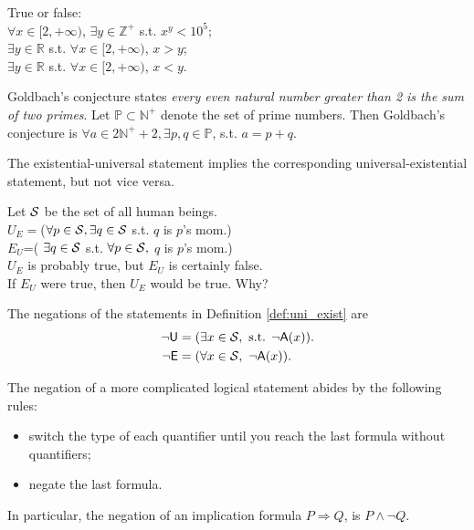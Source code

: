  \begin{exm}
   True or false:\\
   $\forall x\in[2,+\infty)$, $\exists y\in \mathbb{Z}^+$ s.t. $x^y<10^5$;\\
   $\exists y\in \mathbb{R}$ s.t.
   $\forall x\in[2,+\infty)$, $x>y$;\\
   $\exists y\in \mathbb{R}$ s.t.
   $\forall x\in[2,+\infty)$, $x<y$.
 \end{exm}

\begin{exm}
  Goldbach's conjecture states
   \emph{every even natural number greater than 2
     is the sum of two primes}.
  Let $\mathbb{P}\subset \mathbb{N}^+$
   denote the set of prime numbers.
  Then Goldbach's conjecture is
  $\forall a\in 2\mathbb{N}^++2,
   \exists p,q\in \mathbb{P}$, s.t. $a=p+q$.
 \end{exm}
 
 \begin{thm}
   \label{thm:existUnivImpliesUnivExist}
   The existential-universal statement
    implies the corresponding universal-existential statement,
    but not vice versa.
 \end{thm}

 \begin{exm}
   Let ${\cal S}$ be the set of all human beings.\\
   $U_E=$($\forall p\in{\cal S}, \exists q\in{\cal S}$ s.t. $q$ is $p$'s mom.)
   \\
   $E_U$=( $\exists q\in{\cal S}$ s.t.
   $\forall p\in{\cal S}, $ $q$ is $p$'s mom.)\\
   $U_E$ is probably true, but $E_U$ is certainly false. \\
   If $E_U$ were true, then $U_E$ would be true. Why?
 \end{exm}

\begin{axm}
  The negations of the statements in Definition \ref{def:uni_exist}
  are
  \begin{align}
  \neg \mathsf{U} &= (\exists x\in {\cal S},\text{ s.t. }
  \neg \mathsf{A}(x)).
  \\
  \neg \mathsf{E} &= (\forall x\in {\cal S},\ 
  \neg \mathsf{A}(x)).
  \end{align}
\end{axm}

\begin{rul}
  The negation of a more complicated logical statement
   abides by the following rules:
\begin{itemize}\itemsep0em
\item switch the type of each quantifier until
  you reach the last formula without quantifiers;
\item negate the last formula.
\end{itemize}
In particular, the negation of an implication formula
$P \Rightarrow Q$,
 is $P \wedge \neg Q$.
\end{rul}

